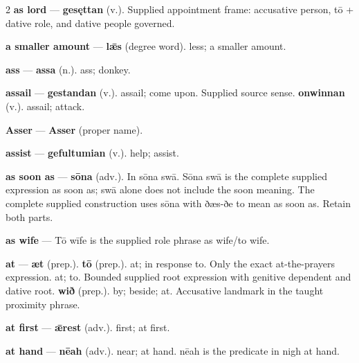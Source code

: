 \begin{multicols}{2}
\textbf{as lord} — \textbf{gesęttan} (v.). Supplied appointment frame: accusative person, tō + dative role, and dative people governed.\par
\textbf{a smaller amount} — \textbf{lǣs} (degree word). less; a smaller amount.\par
\textbf{ass} — \textbf{assa} (n.). ass; donkey.\par
\textbf{assail} — \textbf{gestandan} (v.). assail; come upon. Supplied source sense. \textbf{onwinnan} (v.). assail; attack.\par
\textbf{Asser} — \textbf{Asser} (proper name).\par
\textbf{assist} — \textbf{gefultumian} (v.). help; assist.\par
\textbf{as soon as} — \textbf{sōna} (adv.). In sōna swā. Sōna swā is the complete supplied expression as soon as; swā alone does not include the soon meaning. The complete supplied construction uses sōna with ðæs-ðe to mean as soon as. Retain both parts.\par
\textbf{as wife} — Tō wīfe is the supplied role phrase as wife/to wife.\par
\textbf{at} — \textbf{æt} (prep.).  \textbf{tō} (prep.). at; in response to. Only the exact at-the-prayers expression. at; to. Bounded supplied root expression with genitive dependent and dative root. \textbf{wið} (prep.). by; beside; at. Accusative landmark in the taught proximity phrase.\par
\textbf{at first} — \textbf{ǣrest} (adv.). first; at first.\par
\textbf{at hand} — \textbf{nēah} (adv.). near; at hand. nēah is the predicate in nigh at hand.\par

\end{multicols}
